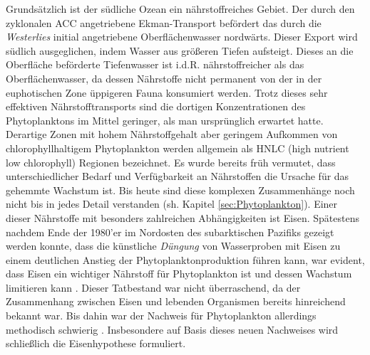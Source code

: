 \documentclass[12pt,a4paper,onecolumn]{scrartcl}
\begin{document}
Grundsätzlich ist der südliche Ozean ein nährstoffreiches Gebiet. Der durch den zyklonalen ACC angetriebene Ekman-Transport befördert das durch die \textit{Westerlies} initial angetriebene Oberflächenwasser nordwärts. Dieser Export wird südlich ausgeglichen, indem Wasser aus größeren Tiefen aufsteigt. Dieses an die Oberfläche beförderte Tiefenwasser ist i.d.R. nährstoffreicher als das Oberflächenwasser, da dessen Nährstoffe nicht permanent von der in der euphotischen Zone üppigeren Fauna konsumiert werden. Trotz dieses sehr effektiven Nährstofftransports sind die dortigen Konzentrationen des Phytoplanktons im Mittel geringer, als man ursprünglich erwartet hatte. Derartige Zonen mit hohem Nährstoffgehalt aber geringem Aufkommen von chlorophyllhaltigem Phytoplankton werden allgemein als HNLC (high nutrient low chlorophyll) Regionen bezeichnet. Es wurde bereits früh vermutet, dass unterschiedlicher Bedarf und Verfügbarkeit an Nährstoffen die Ursache für das gehemmte Wachstum ist. Bis heute sind diese komplexen Zusammenhänge noch nicht bis in jedes Detail verstanden (sh. Kapitel \ref{sec:Phytoplankton}). Einer dieser Nährstoffe mit besonders zahlreichen Abhängigkeiten ist Eisen. Spätestens nachdem Ende der 1980'er im Nordosten des subarktischen Pazifiks gezeigt werden konnte, dass die künstliche \textit{Düngung} von Wasserproben mit Eisen zu einem deutlichen Anstieg der Phytoplanktonproduktion führen kann, war evident, dass Eisen ein wichtiger Nährstoff für Phytoplankton ist und dessen Wachstum limitieren kann \citep{Martin.1988}. Dieser Tatbestand war nicht überraschend, da der Zusammenhang zwischen Eisen und lebenden Organismen bereits hinreichend bekannt war. Bis dahin war der Nachweis für Phytoplankton allerdings methodisch schwierig \citep{Martin.1988}. Insbesondere auf Basis dieses neuen Nachweises wird schließlich die Eisenhypothese formuliert. \\
\end{document}

